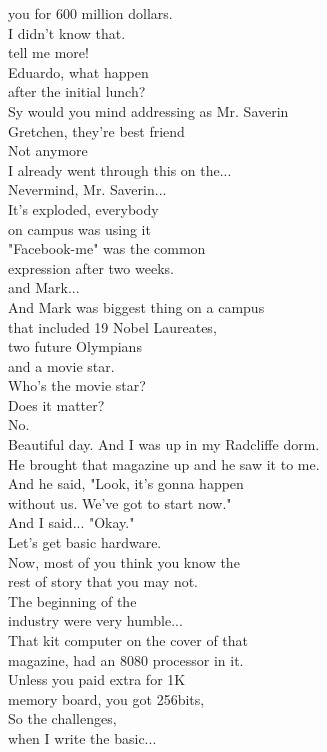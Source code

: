 \documentclass{article}
\begin{document}
\begin{multicols}{3}
you for 600 million dollars.\\
I didn't know that.\\
tell me more!\\
Eduardo, what happen\\
after the initial lunch?\\
Sy would you mind addressing as Mr. Saverin\\
Gretchen, they're best friend\\
Not anymore\\
I already went through this on the...\\
Nevermind, Mr. Saverin...\\
It's exploded, everybody\\
on campus was using it\\
"Facebook-me" was the common\\
expression after two weeks.\\
and Mark...\\
And Mark was biggest thing on a campus\\
that included 19 Nobel Laureates,\\
two future Olympians\\
and a movie star.\\
Who's the movie star?\\
Does it matter?\\
No.\\
Beautiful day. And I was up in my Radcliffe dorm.\\
He brought that magazine up and he saw it to me.\\
And he said, "Look, it's gonna happen\\
without us. We've got to start now."\\
And I said... "Okay."\\
Let's get basic hardware.\\
Now, most of you think you know the\\
rest of story that you may not.\\
The beginning of the\\
industry were very humble...\\
That kit computer on the cover of that\\
magazine, had an 8080 processor in it.\\
Unless you paid extra for 1K\\
memory board, you got 256bits,\\
So the challenges,\\
when I write the basic...\\

\end{multicols}
\end{document}
